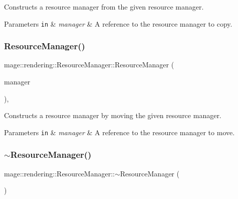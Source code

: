 Constructs a resource manager from the given resource manager.


\begin{DoxyParams}[1]{Parameters}
\mbox{\tt in}  & {\em manager} & A reference to the resource manager to copy. \\
\hline
\end{DoxyParams}
\mbox{\label{classmage_1_1rendering_1_1_resource_manager_a3d54199cf484d11c1d1039eeb306016c}} 
\subsubsection{\texorpdfstring{Resource\+Manager()}{ResourceManager()}\hspace{0.1cm}{\footnotesize\ttfamily [3/3]}}
{\footnotesize\ttfamily mage\+::rendering\+::\+Resource\+Manager\+::\+Resource\+Manager (\begin{DoxyParamCaption}\item[{\mbox{\hyperlink{classmage_1_1rendering_1_1_resource_manager}{Resource\+Manager}} \&\&}]{manager }\end{DoxyParamCaption})\hspace{0.3cm}{\ttfamily [default]}, {\ttfamily [noexcept]}}

Constructs a resource manager by moving the given resource manager.


\begin{DoxyParams}[1]{Parameters}
\mbox{\tt in}  & {\em manager} & A reference to the resource manager to move. \\
\hline
\end{DoxyParams}
\mbox{\label{classmage_1_1rendering_1_1_resource_manager_a7289ca2a270e6de613eff041ba04d4a4}} 
\subsubsection{\texorpdfstring{$\sim$\+Resource\+Manager()}{~ResourceManager()}}
{\footnotesize\ttfamily mage\+::rendering\+::\+Resource\+Manager\+::$\sim$\+Resource\+Manager (\begin{DoxyParamCaption}{ }\end{DoxyParamCaption})\hspace{0.3cm}{\ttfamily [default]}}

